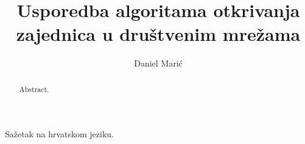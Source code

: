 \documentclass[times, utf8, diplomski]{fer}
\begin{document}

\title{Usporedba algoritama otkrivanja zajednica u društvenim mrežama}

\author{Daniel Marić}

\maketitle

\izvornik

\zahvala{}

\tableofcontents




















\begin{sazetak}
Sažetak na hrvatskom jeziku.

\end{sazetak}

\begin{abstract}
Abstract.

\end{abstract}
\end{document}
